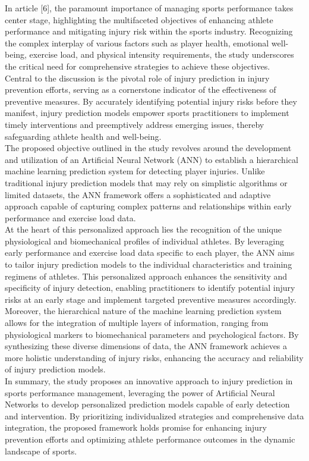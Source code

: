 \documentclass[12pt, English]{article}
\begin{document}
\begin{normalsize}
In article [6], the paramount importance of managing sports performance takes center stage, highlighting the multifaceted objectives of enhancing athlete performance and mitigating injury risk within the sports industry. Recognizing the complex interplay of various factors such as player health, emotional well-being, exercise load, and physical intensity requirements, the study underscores the critical need for comprehensive strategies to achieve these objectives.\\
Central to the discussion is the pivotal role of injury prediction in injury prevention efforts, serving as a cornerstone indicator of the effectiveness of preventive measures. By accurately identifying potential injury risks before they manifest, injury prediction models empower sports practitioners to implement timely interventions and preemptively address emerging issues, thereby safeguarding athlete health and well-being.\\
The proposed objective outlined in the study revolves around the development and utilization of an Artificial Neural Network (ANN) to establish a hierarchical machine learning prediction system for detecting player injuries. Unlike traditional injury prediction models that may rely on simplistic algorithms or limited datasets, the ANN framework offers a sophisticated and adaptive approach capable of capturing complex patterns and relationships within early performance and exercise load data.\\
At the heart of this personalized approach lies the recognition of the unique physiological and biomechanical profiles of individual athletes. By leveraging early performance and exercise load data specific to each player, the ANN aims to tailor injury prediction models to the individual characteristics and training regimens of athletes. This personalized approach enhances the sensitivity and specificity of injury detection, enabling practitioners to identify potential injury risks at an early stage and implement targeted preventive measures accordingly.\\
Moreover, the hierarchical nature of the machine learning prediction system allows for the integration of multiple layers of information, ranging from physiological markers to biomechanical parameters and psychological factors. By synthesizing these diverse dimensions of data, the ANN framework achieves a more holistic understanding of injury risks, enhancing the accuracy and reliability of injury prediction models.\\
In summary, the study proposes an innovative approach to injury prediction in sports performance management, leveraging the power of Artificial Neural Networks to develop personalized prediction models capable of early detection and intervention. By prioritizing individualized strategies and comprehensive data integration, the proposed framework holds promise for enhancing injury prevention efforts and optimizing athlete performance outcomes in the dynamic landscape of sports.
\\


\end{normalsize}
\end{document}

